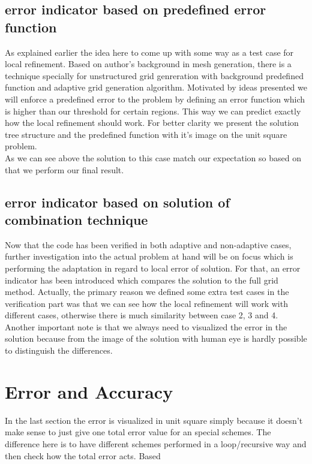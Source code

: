 \subsection{error indicator based on predefined error function}
As explained earlier the idea here to come up with some way as a test case for local refinement. Based on author's background in mesh generation, there is a technique specially for unstructured grid genreration with background predefined function \cite{Henshaw1996} and adaptive grid generation algorithm\cite{Ebeida2010}. Motivated by ideas presented we will enforce a predefined error to the problem by defining an error function which is higher than our threshold for certain regions. This way we can predict exactly how the local refinement should work. For better clarity we present the solution tree structure and the predefined function with it's image on the unit square problem.\\ %
As we can see above the solution to this case match our expectation so based on that we perform our final result.
\subsection{error indicator based on solution of combination technique}
Now that the code has been verified in both adaptive and non-adaptive cases, further investigation into the actual problem at hand will be on focus which is performing the adaptation in regard to local error of solution. For that, an error indicator has been introduced which compares the solution to the full grid method. Actually, the primary reason we defined some extra test cases in the verification part was that we can see how the local refinement will work with different cases, otherwise there is much similarity between case 2, 3 and 4. \\

Another important note is that we always need to visualized the error in the solution because from the image of the solution with human eye is hardly possible to distinguish the differences.

\section{Error and Accuracy}
In the last section the error is visualized in unit square simply because it doesn't make sense to just give one total error value for an special schemes. The difference here is to have different schemes performed in a loop/recursive way and then check how the total error acts. Based  
